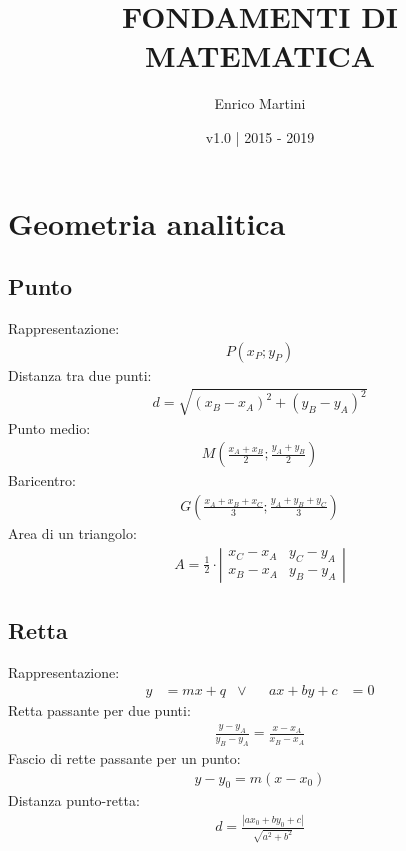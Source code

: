 \documentclass[a4paper]{article}
\title{FONDAMENTI DI MATEMATICA}
\author{Enrico Martini}
\date{v1.0 | 2015 - 2019}
\begin{document}
	
	\maketitle
	\thispagestyle{empty}
	\newpage
	\tableofcontents
	\thispagestyle{empty}
	\newpage
	
	\section{Geometria analitica}
	\subsection{Punto}
	Rappresentazione:
	\begin{align*}
		P(x_P;y_P)
	\end{align*}
	Distanza tra due punti:
	\begin{align*}
		d = \sqrt{(x_B -x _A)^2+(y_B - y_A)^2}
	\end{align*}
	Punto medio:
	\begin{align*}
		M \left( \frac{x_A + x_B}{2} ; \frac{y_A + y_B}{2} \right)
	\end{align*}
	Baricentro:
	\begin{align*}
		G \left( \frac{x_A + x_B + x_C}{3} ; \frac{y_A + y_B + y_C}{3} \right) 
	\end{align*}
	Area di un triangolo:
	\begin{align*}
		A = \frac{1}{2} \cdot \left| \begin{array}{cc}
		x_C-x_A & y_C-y_A \\ 
		x_B-x_A & y_B-y_A
		\end{array} \right|
	\end{align*}
	
	\subsection{Retta}
	Rappresentazione:
	\begin{align*}
		y &= mx + q		&\vee&&		ax + by + c & = 0
	\end{align*}
	Retta passante per due punti:
	\begin{align*}
		\frac{y-y_A}{y_B-y_A} = \frac{x-x_A}{x_B-x_A}
	\end{align*}
	Fascio di rette passante per un punto:
	\begin{align*}
		y-y_0 = m(x-x_0)
	\end{align*}
	Distanza punto-retta:
	\begin{align*}
		d = \frac{|ax_0+by_0+c|}{\sqrt{a^2+b^2}}
	\end{align*}
		
\end{document}
